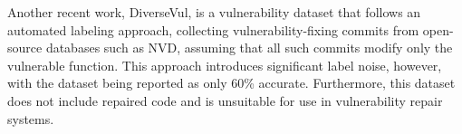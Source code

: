 Another recent work, DiverseVul\cite{chen2023diversevul}, is a vulnerability dataset that follows an automated labeling approach, collecting vulnerability-fixing commits from open-source databases such as NVD, assuming that all such commits modify only the vulnerable function.
This approach introduces significant label noise, however, with the dataset being reported as only 60\% accurate.
Furthermore, this dataset does not include repaired code and is unsuitable for use in vulnerability repair systems.